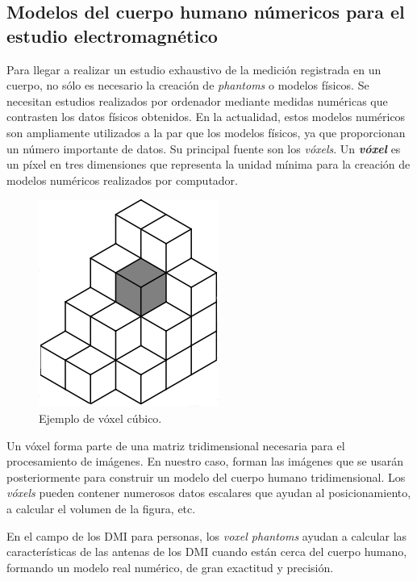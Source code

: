 \subsection{Modelos del cuerpo humano númericos para el estudio electromagnético}\label{subsec:modelos-del-cuerpo-humano-numericos-para-el-estudio-electromagnetico}

Para llegar a realizar un estudio exhaustivo de la medición registrada en un cuerpo, no sólo es necesario la creación de \textit{phantoms} o modelos físicos. Se necesitan estudios realizados por ordenador mediante medidas numéricas que contrasten los datos físicos obtenidos. En la actualidad, estos modelos numéricos son ampliamente utilizados a la par que los modelos físicos, ya que proporcionan un número importante de datos. Su principal fuente son los \textit{vóxels}. Un \textbf{\textit{vóxel}} es un píxel en tres dimensiones que representa la unidad mínima para la creación de modelos numéricos realizados por computador.

\begin{figure}[!htb]
    \centering
    \includegraphics[scale=0.3]{./ContextoTecnologico/voxel}
    \caption{Ejemplo de vóxel cúbico. \cite{voxel}}
    \label{fig:fig3.3}
\end{figure}

Un vóxel forma parte de una matriz tridimensional necesaria para el procesamiento de imágenes. En nuestro caso, forman las imágenes que se usarán posteriormente para construir un modelo del cuerpo humano tridimensional. Los \textit{vóxels} pueden contener numerosos datos escalares que ayudan al posicionamiento, a calcular el volumen de la figura, etc.

En el campo de los DMI para personas, los \textit{voxel phantoms} ayudan a calcular las características de las antenas de los DMI cuando están cerca del cuerpo humano, formando un modelo real numérico, de gran exactitud y precisión.


